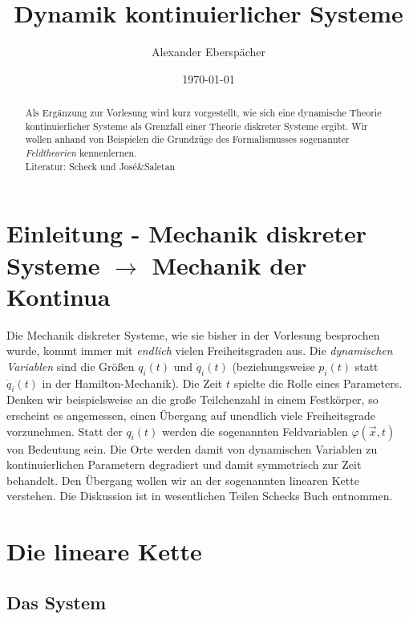\documentclass[paper=a4, fontsize=11.0pt, abstractoff, DIV12]{scrartcl}
\title{Dynamik kontinuierlicher Systeme}
\author{Alexander Eberspächer}
\date{\today}
\begin{document}
\maketitle
\begin{abstract}
Als Ergänzung zur Vorlesung wird kurz vorgestellt, wie sich eine dynamische
Theorie kontinuierlicher Systeme als Grenzfall einer Theorie diskreter
Systeme ergibt. Wir wollen anhand von Beispielen die Grundzüge des
Formalismusses sogenannter \emph{Feldtheorien} kennenlernen.\\[0.5ex]
Literatur: Scheck \cite{Scheck} und José\&Saletan \cite{JoseSaletan}
\end{abstract}

\section{Einleitung - Mechanik diskreter Systeme $\to$ Mechanik der Kontinua}

Die Mechanik diskreter Systeme, wie sie bisher in der Vorlesung besprochen
wurde, kommt immer mit \emph{endlich} vielen Freiheitsgraden aus. Die
\emph{dynamischen Variablen} sind die Größen $q_i(t)$ und $\dot{q}_i(t)$
(beziehungsweise $p_i(t)$ statt $\dot{q}_i(t)$ in der Hamilton-Mechanik).
Die Zeit $t$ spielte die Rolle eines Parameters. Denken wir beispielsweise
an die große Teilchenzahl in einem Festkörper, so erscheint es angemessen,
einen Übergang auf unendlich viele Freiheitsgrade vorzunehmen. Statt der
$q_i(t)$ werden die sogenannten Feldvariablen $\varphi(\vec x, t)$ von
Bedeutung sein. Die Orte werden damit von dynamischen Variablen zu
kontinuierlichen Parametern degradiert und damit symmetrisch zur Zeit
behandelt. Den Übergang wollen wir an der sogenannten linearen Kette
verstehen. Die Diskussion ist in wesentlichen Teilen Schecks Buch
\cite{Scheck} entnommen.

\section{Die lineare Kette}

\subsection{Das System}
\end{document}
